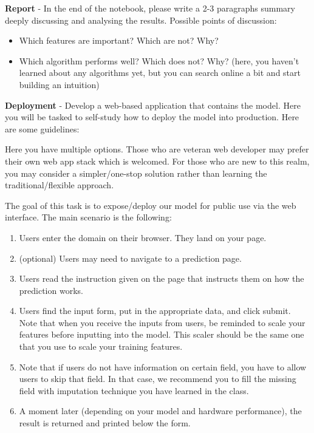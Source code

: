 \documentclass{homework}
\begin{document}
\task \textbf{Report} - In the end of the notebook, please write a 2-3 paragraphs summary deeply discussing and analysing the results.  Possible points of discussion:

\begin{itemize}
    \item Which features are important?  Which are not?  Why?
    \item Which algorithm performs well?  Which does not?  Why?  (here, you haven't learned about any algorithms yet, but you can search online a bit and start building an intuition)
\end{itemize}

\task \textbf{Deployment} - Develop a web-based application that contains the model.  Here you will be tasked to self-study how to deploy the model into production.  Here are some guidelines:

Here you have multiple options. Those who are veteran web developer may prefer their own web app stack which is welcomed. For those who are new to this realm, you may consider a simpler/one-stop solution rather than learning the traditional/flexible approach.

The goal of this task is to expose/deploy our model for public use via the web interface. The main scenario is the following:

\begin{enumerate}
    \item Users enter the domain on their browser. They land on your page.
    \item (optional) Users may need to navigate to a prediction page.
    \item Users read the instruction given on the page that instructs them on how the prediction works.
    \item Users find the input form, put in the appropriate data, and click submit. Note that when you receive the inputs from users, be reminded to scale your features before inputting into the model.  This scaler should be the same one that you use to scale your training features.
    \item Note that if users do not have information on certain field, you have to allow users to skip that field.  In that case, we recommend you to fill the missing field with imputation technique you have learned in the class.
    \item A moment later (depending on your model and hardware performance), the result is returned and printed below the form.
\end{enumerate}
\end{document}

